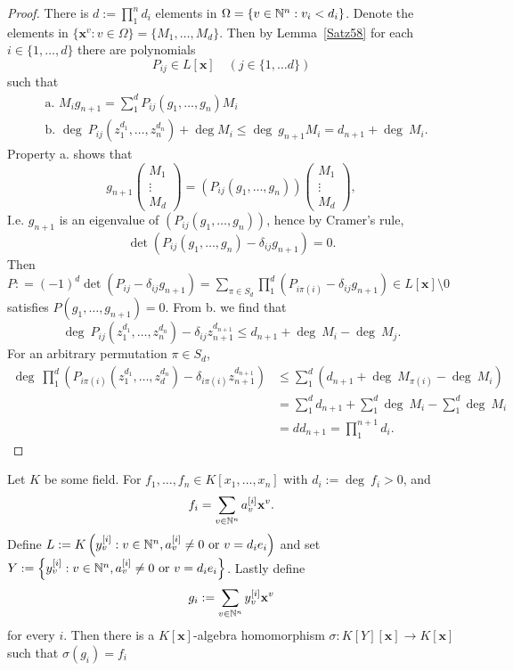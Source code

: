     \begin{proof}
        There is $d:= \prod_1^n d_i$ elements in $\Omega=\{v\in \mathbb{N}^n : v_i<d_i\}$. Denote the elements in $\{\mathbf{x}^v : v\in \Omega\}=\{M_1,\dots,M_{d}\}$. Then by Lemma~\ref{Satz58} for each $i\in\{1,\dots,d\}$ there are polynomials 
        $$P_{ij}\in L[\mathbf{x}]\quad (j\in\{1,\dots d\})$$
        such that 
        \begin{align*}
            &\text{a. } M_ig_{n+1}=\sum_1^d P_{ij}(g_1,\dots,g_n)M_i\\
            &\text{b. } \deg\ P_{ij}(z_1^{d_1},\dots,z_n^{d_n}) + \deg M_i\leq \deg \ g_{n+1}M_i = d_{n+1}+\deg \ M_i.
        \end{align*}
        Property a. shows that 
        $$
            g_{n+1}
            \begin{pmatrix}
                M_1\\ \vdots\\ M_d
            \end{pmatrix} 
            =
            (P_{ij}(g_1,\dots,g_n)) \begin{pmatrix}
                M_1\\ \vdots\\ M_d
            \end{pmatrix}, 
        $$
        I.e. $g_{n+1}$ is an eigenvalue of $(P_{ij}(g_1,\dots,g_n))$, hence by Cramer's rule,  
        $$
            \det(P_{ij}(g_1,\dots,g_n)-\delta_{ij}g_{n+1}) =  0.$$ 
        Then $P: = (-1)^d\det(P_{ij}-\delta_{ij}g_{n+1})= \sum_{\pi\in S_d} \prod_1^d (P_{i\pi(i)}-\delta_{ij}g_{n+1})\in L[\mathbf{x}]\setminus 0$ satisfies $P(g_1,\dots,g_{n+1})=0.$ From b. we find that 
        $$
            \deg \ P_{ij}(z_1^{d_1},\dots,z_n^{d_n}) - \delta_{ij}z_{n+1}^{d_{n+1}}\leq d_{n+1}+\deg \ M_i - \deg \ M_j.
        $$
        For an arbitrary permutation $\pi \in S_d$,
        \begin{align*}
            \deg \ \prod_1^d (P_{i\pi(i)}(z_1^{d_1},\dots,z_d^{d_n})-\delta_{i\pi(i)}z_{n+1}^{d_{n+1}})&\leq \sum_1^d (d_{n+1} + \deg\ M_{\pi(i)}-\deg \ M_{i})\\
            &= \sum_1^d d_{n+1} + \sum_1^d \deg \ M_i -\sum_1^d\deg \ M_i\\ &= d d_{n+1} = \prod_1^{n+1} d_i. 
        \end{align*}
    \end{proof}
    \begin{lemma}
        Let $K$ be some field. For $f_1,\dots,f_n\in K[x_1,\dots,x_n]$ with $d_i := \deg\ f_i>0$, and 
        $$f_i = \sum_{v\in \mathbb{N}^n} a_v^{[i]}\mathbf{x}^v.$$
        Define $L:= K\left( y_v^{[i]} : v\in \mathbb{N}^n, a_v^{[i]}\neq 0 \text{ or } v=d_ie_i\right)$ and set $Y:=\left\{y_v^{[i]} : v\in \mathbb{N}^n, a_v^{[i]}\neq 0 \text{ or } v=d_ie_i\right\}$. Lastly define 
        $$g_i := \sum_{v\in \mathbb{N}^n} y_v^{[i]}\mathbf{x}^v$$
        for every $i$. Then there is a $K[\mathbf{x}]$-algebra homomorphism $\sigma: K[Y][\mathbf{x}]\rightarrow K[\mathbf{x}]$ such that $\sigma(g_i)=f_i$
    \end{lemma}
